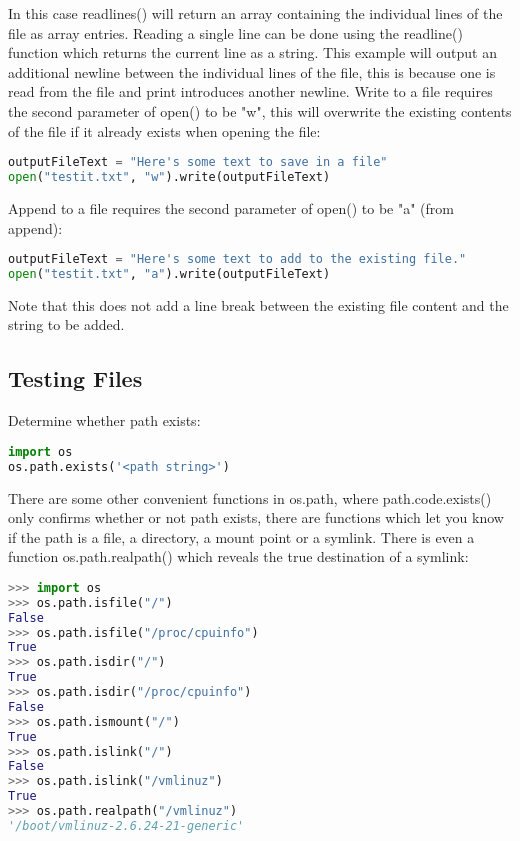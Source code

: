 In this case readlines() will return an array containing the individual lines of
the file as array entries. Reading a single line can be done using the
readline() function which returns the current line as a string. This example
will output an additional newline between the individual lines of the file, this
is because one is read from the file and print introduces another newline.
Write to a file requires the second parameter of open() to be "w", this will
overwrite the existing contents of the file if it already exists when opening
the file:
\lstset{basicstyle=\scriptsize, numbers=left, captionpos=b, tabsize=4}
\begin{lstlisting}[caption=Write to file,language={Python},
xleftmargin=15pt, label=lst:writetofile]
outputFileText = "Here's some text to save in a file"
open("testit.txt", "w").write(outputFileText)
\end{lstlisting}

Append to a file requires the second parameter of open() to be "a" (from append):
\lstset{basicstyle=\scriptsize, numbers=left, captionpos=b, tabsize=4}
\begin{lstlisting}[caption=Append to file,language={Python},
xleftmargin=15pt, label=lst:appendtofile]
outputFileText = "Here's some text to add to the existing file."
open("testit.txt", "a").write(outputFileText)
\end{lstlisting}

Note that this does not add a line break between the existing file content and
the string to be added.

\subsection{Testing Files}
Determine whether path exists:
\lstset{basicstyle=\scriptsize, numbers=left, captionpos=b, tabsize=4}
\begin{lstlisting}[caption=Test if file exists,language={Python},
xleftmargin=15pt, label=lst:testiffileexists]
import os
os.path.exists('<path string>')
\end{lstlisting}

There are some other convenient functions in os.path, where path.code.exists()
only confirms whether or not path exists, there are functions which let you know
if the path is a file, a directory, a mount point or a symlink. There is even a
function os.path.realpath() which reveals the true destination of a symlink:
\lstset{basicstyle=\scriptsize, numbers=left, captionpos=b, tabsize=4}
\begin{lstlisting}[caption=Test Path,language={Python},
xleftmargin=15pt, label=lst:testpath]
>>> import os
>>> os.path.isfile("/")
False
>>> os.path.isfile("/proc/cpuinfo")
True
>>> os.path.isdir("/")
True
>>> os.path.isdir("/proc/cpuinfo")
False
>>> os.path.ismount("/")
True
>>> os.path.islink("/")
False
>>> os.path.islink("/vmlinuz")
True
>>> os.path.realpath("/vmlinuz")
'/boot/vmlinuz-2.6.24-21-generic'
\end{lstlisting}

